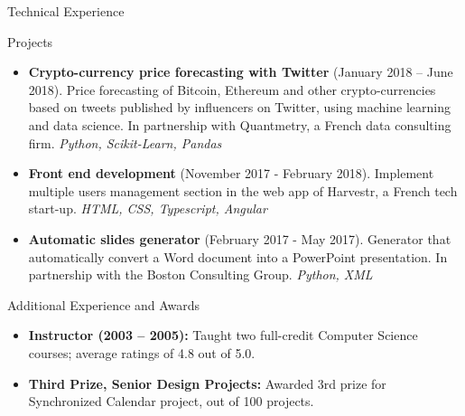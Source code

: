 \documentclass[]{mcdowellcv}
\begin{document}
    \begin{cvsection}{Technical Experience}
        \begin{cvsubsection}{Projects}{}{}
            \begin{itemize}

                \item \textbf{Crypto-currency price forecasting with Twitter} (January 2018 -- June 2018).
                Price forecasting of Bitcoin, Ethereum and other crypto-currencies based on tweets published by influencers on Twitter, using machine learning and data science.
                In partnership with Quantmetry, a French data consulting firm.
                \textit{Python, Scikit-Learn, Pandas}

                \item \textbf{Front end development} (November 2017 - February 2018).
                Implement multiple users management section in the web app of Harvestr, a French tech start-up.
                \textit{HTML, CSS, Typescript, Angular}

                \item \textbf{Automatic slides generator} (February 2017 - May 2017).
                Generator that automatically convert a Word document into a PowerPoint presentation.
                In partnership with the Boston Consulting Group.
                \textit{Python, XML}

            \end{itemize}
        \end{cvsubsection}
    \end{cvsection}

    \begin{cvsection}{Additional Experience and Awards}
        \begin{cvsubsection}{}{}{}
            \begin{itemize}
                \item \textbf{Instructor (2003 – 2005):} Taught two full-credit Computer Science courses; average ratings of 4.8 out of 5.0.
                \item \textbf{Third Prize, Senior Design Projects:} Awarded 3rd prize for Synchronized Calendar project, out of 100 projects.
            \end{itemize}
        \end{cvsubsection}
    \end{cvsection}
\end{document}
